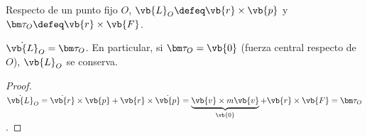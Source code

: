 \begin{definicion}
Respecto de un punto fijo $O$,
$\vb{L}_{O}\defeq\vb{r}\times\vb{p}$ y $\vtorque_{O}\defeq\vb{r}\times\vb{F}$.
\end{definicion}

\begin{proposicion}
\label{prop:L-particula}
$\dot{\vb{L}}_{O}=\vtorque_{O}$. En particular, si $\vtorque_{O}=\vb{0}$ (fuerza
central respecto de $O$), $\vb{L}_{O}$ se conserva.
\end{proposicion}

\begin{proof}
$\dot{\vb{L}}_{O}=\dot{\vb{r}}\times\vb{p}+\vb{r}\times\dot{\vb{p}}
=\underbrace{\vb{v}\times m\vb{v}}_{\vb{0}}+\vb{r}\times\vb{F}=\vtorque_{O}$.
\end{proof}

